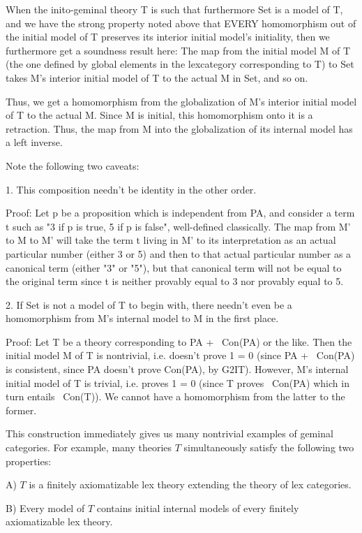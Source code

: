 \begin{TODOblock}
When the inito-geminal theory T is such that furthermore Set is a model of T, and we have the strong property noted above that EVERY homomorphism out of the initial model of T preserves its interior initial model's initiality, then we furthermore get a soundness result here: The map from the initial model M of T (the one defined by global elements in the lexcategory corresponding to T) to Set takes M's interior initial model of T to the actual M in Set, and so on.

Thus, we get a homomorphism from the globalization of M's interior initial model of T to the actual M. Since M is initial, this homomorphism onto it is a retraction. Thus, the map from M into the globalization of its internal model has a left inverse.

Note the following two caveats:

1. This composition needn't be identity in the other order.

Proof: Let p be a proposition which is independent from PA, and consider a term t such as "3 if p is true, 5 if p is false", well-defined classically. The map from M' to M to M' will take the term t living in M' to its interpretation as an actual particular number (either 3 or 5) and then to that actual particular number as a canonical term (either "3" or "5"), but that canonical term will not be equal to the original term since t is neither provably equal to 3 nor provably equal to 5.

2. If Set is not a model of T to begin with, there needn't even be a homomorphism from M's internal model to M in the first place.

Proof: Let T be a theory corresponding to PA + ~Con(PA) or the like. Then the initial model M of T is nontrivial, i.e. doesn't prove 1 = 0 (since PA + ~Con(PA) is consistent, since PA doesn't prove Con(PA), by G2IT). However, M's internal initial model of T is trivial, i.e. proves 1 = 0 (since T proves ~Con(PA) which in turn entails ~Con(T)). We cannot have a homomorphism from the latter to the former.
\end{TODOblock}

This construction immediately gives us many nontrivial examples of geminal categories. For example, many theories $T$ simultaneously satisfy the following two properties:

A) $T$ is a finitely axiomatizable lex theory extending the theory of lex categories.

B) Every model of $T$ contains initial internal models of every finitely axiomatizable lex theory.


